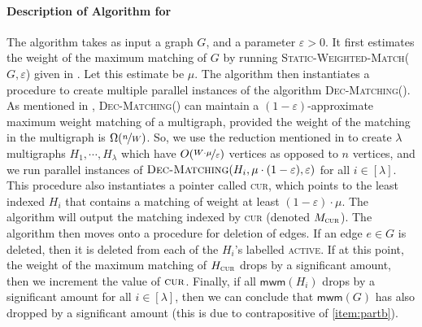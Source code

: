 \documentclass[a4paper,11pt]{article}
\newcommand{\eps}{\varepsilon}
\theoremstyle{definition}
\theoremstyle{definition}
\theoremstyle{definition}
\theoremstyle{definition}
\theoremstyle{definition}
\theoremstyle{definition}
\theoremstyle{definition}
\theoremstyle{definition}
\theoremstyle{definition}
\theoremstyle{definition}
\theoremstyle{definition}
\theoremstyle{definition}
\theoremstyle{definition}
\theoremstyle{definition}
\theoremstyle{definition}
\begin{document}
\paragraph{Description of Algorithm for } The algorithm takes as input a graph $G$, and a parameter $\eps>0$. It first estimates the weight of the maximum matching of $G$ by running \textsc{Static-Weighted-Match}($G,\eps$) given in . Let this estimate be $\mu$. The algorithm then instantiates a procedure to create multiple parallel instances of 
the algorithm \textsc{Dec-Matching}(). As mentioned in , \textsc{Dec-Matching}() can maintain a $(1-\eps)$-approximate maximum weight matching of a multigraph, provided the weight of the matching in the multigraph is $\Omega(\nicefrac{n}{W})$. So, we use the reduction mentioned in  to create $\lambda$ multigraphs $H_1,\cdots, H_{\lambda}$ which have $O(\nicefrac{W\cdot \mu}{\eps})$ vertices as opposed to $n$ vertices, and we run parallel instances of $\textsc{Dec-Matching}(H_i,\mu\cdot(1-\eps),\eps)$ for all $i\in [\lambda]$. This procedure also instantiates a pointer called \textsc{cur}, which points to the least indexed $H_i$ that contains a matching of weight at least $(1-\eps)\cdot \mu $. The algorithm will output the matching indexed by \textsc{cur} (denoted $M_{\textsc{cur}}$). The algorithm then moves onto a procedure for deletion of edges. If an edge $e\in G$ is deleted, then it is deleted from each of the $H_i$'s labelled \textsc{active}. If at this point, the weight of the maximum matching of $H_{\textsc{cur}}$ drops by a significant amount, then we increment the value of $\textsc{cur}$. Finally, if all $\textsf{mwm}(H_i)$ drops by a significant amount for all $i\in [\lambda]$, then we can conclude that $\textsf{mwm}(G)$ has also dropped by a significant amount (this is due to contrapositive of \ref{item:partb}). 
\end{document}
